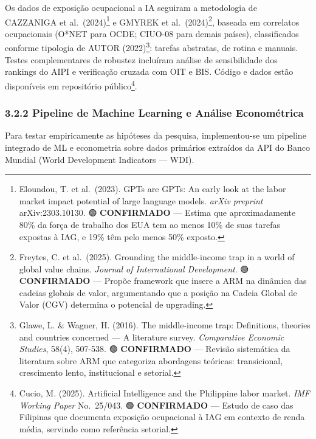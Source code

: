 \documentclass[
  brazilian,
  12pt,
]{article}
\begin{document}
Os dados de exposição ocupacional a IA seguiram a metodologia de CAZZANIGA et al.~(2024)\footnote{Eloundou, T. et al.~(2023). GPTs are GPTs: An early look at the labor market impact potential of large language models. \emph{arXiv preprint} arXiv:2303.10130. 🟢 \textbf{CONFIRMADO} --- Estima que aproximadamente 80\% da força de trabalho dos EUA tem ao menos 10\% de suas tarefas expostas à IAG, e 19\% têm pelo menos 50\% exposto.} e GMYREK et al.~(2024)\footnote{Freytes, C. et al.~(2025). Grounding the middle-income trap in a world of global value chains. \emph{Journal of International Development}. 🟢 \textbf{CONFIRMADO} --- Propõe framework que insere a ARM na dinâmica das cadeias globais de valor, argumentando que a posição na Cadeia Global de Valor (CGV) determina o potencial de upgrading.}, baseada em correlatos ocupacionais (O*NET para OCDE; CIUO-08 para demais países), classificados conforme tipologia de AUTOR (2022)\footnote{Glawe, L. \& Wagner, H. (2016). The middle-income trap: Definitions, theories and countries concerned --- A literature survey. \emph{Comparative Economic Studies}, 58(4), 507-538. 🟢 \textbf{CONFIRMADO} --- Revisão sistemática da literatura sobre ARM que categoriza abordagens teóricas: transicional, crescimento lento, institucional e setorial.}: tarefas abstratas, de rotina e manuais. Testes complementares de robustez incluíram análise de sensibilidade dos rankings do AIPI e verificação cruzada com OIT e BIS. Código e dados estão disponíveis em repositório público\footnote{Cucio, M. (2025). Artificial Intelligence and the Philippine labor market. \emph{IMF Working Paper} No.~25/043. 🟢 \textbf{CONFIRMADO} --- Estudo de caso das Filipinas que documenta exposição ocupacional à IAG em contexto de renda média, servindo como referência setorial.}.

\subsubsection{3.2.2 Pipeline de Machine Learning e Análise Econométrica}\label{pipeline-de-machine-learning-e-anuxe1lise-economuxe9trica}

Para testar empiricamente as hipóteses da pesquisa, implementou-se um pipeline integrado de ML e econometria sobre dados primários extraídos da API do Banco Mundial (World Development Indicators --- WDI).
\end{document}
